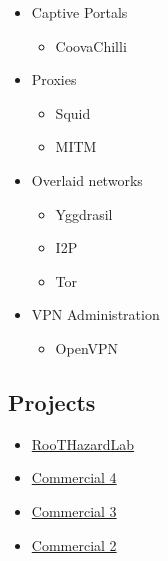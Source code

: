 \begin{itemize}
        \item Captive Portals
        \begin{itemize}
            \item CoovaChilli
        \end{itemize}

        \item Proxies
        \begin{itemize}
            \item Squid
            \item MITM
        \end{itemize}

        \item Overlaid networks
        \begin{itemize}
            \item Yggdrasil
            \item I2P
            \item Tor
        \end{itemize}

        \item VPN Administration
        \begin{itemize}
            \item OpenVPN
        \end{itemize}
\end{itemize}

\subsection{Projects}

\begin{itemize}
    \item \hyperlink{proj_rhl}{RooTHazardLab}
    \item \hyperlink{proj_com4}{Commercial 4}
    \item \hyperlink{proj_com3}{Commercial 3}
    \item \hyperlink{proj_com2}{Commercial 2}
\end{itemize}

\newpage
